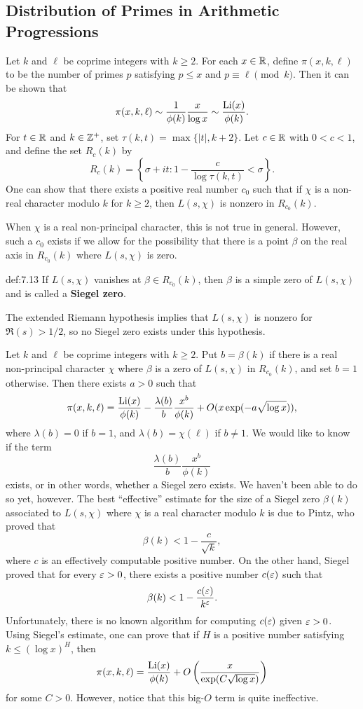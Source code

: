 \subsection{Distribution of Primes in Arithmetic Progressions}\label{subsec:7.7}
Let $k$ and $\ell$ be coprime integers with $k \geq 2$. For each $x \in \mathbb{R}$, 
define $\pi(x, k, \ell)$ to be the number of primes $p$ satisfying 
$p \leq x$ and $p \equiv \ell \pmod k$. Then it can be shown that 
\[ \pi(x, k, \ell) \sim \frac{1}{\phi(k)} \frac{x}{\log x} \sim \frac{\operatorname{Li}(x)}{\phi(k)}. \] 
For $t \in \mathbb{R}$ and $k \in \mathbb{Z}^+$, set $\tau(k, t) = \max\{|t|, k + 2\}$. 
Let $c \in \mathbb{R}$ with $0 < c < 1$, and define the set $R_c(k)$ by 
\[ R_c(k) = \left\{ \sigma + it : 1 - \frac{c}{\log \tau(k, t)} < \sigma \right\}. \] 
One can show that there exists a positive real number $c_0$ such that if 
$\chi$ is a non-real character modulo $k$ for $k \geq 2$, then $L(s, \chi)$ 
is nonzero in $R_{c_0}(k)$. 

When $\chi$ is a real non-principal character, this is not true in general. 
However, such a $c_0$ exists if we allow for the possibility that 
there is a point $\beta$ on the real axis in $R_{c_0}(k)$ where 
$L(s, \chi)$ is zero. 

\begin{defn}{def:7.13} 
    If $L(s, \chi)$ vanishes at $\beta \in R_{c_0}(k)$, then $\beta$ is a 
    simple zero of $L(s, \chi)$ and is called a {\bf Siegel zero}. 
\end{defn}

The extended Riemann hypothesis implies that $L(s, \chi)$ is nonzero for 
$\Re(s) > 1/2$, so no Siegel zero exists under this hypothesis. 

Let $k$ and $\ell$ be coprime integers with $k \geq 2$. Put $b = \beta(k)$ 
if there is a real non-principal character $\chi$ where $\beta$ is a 
zero of $L(s, \chi)$ in $R_{c_0}(k)$, and set $b = 1$ otherwise. Then 
there exists $a > 0$ such that 
\[ \pi(x, k, \ell) = \frac{\operatorname{Li}(x)}{\phi(k)} - \frac{\lambda(b)}{b} \frac{x^b}{\phi(k)} 
+ O(x \exp(-a\sqrt{\log x})), \] 
where $\lambda(b) = 0$ if $b = 1$, and $\lambda(b) = \chi(\ell)$ if $b \neq 1$. 
We would like to know if the term 
\[ \frac{\lambda(b)}{b} \frac{x^b}{\phi(k)} \] 
exists, or in other words, whether a Siegel zero exists. We haven't been 
able to do so yet, however. The best ``effective'' estimate for the size 
of a Siegel zero $\beta(k)$ associated to $L(s, \chi)$ where $\chi$ is a 
real character modulo $k$ is due to Pintz, who proved that 
\[ \beta(k) < 1 - \frac{c}{\sqrt{k}}, \] 
where $c$ is an effectively computable positive number. On the other hand, 
Siegel proved that for every $\varepsilon > 0$, there exists a positive 
number $c(\varepsilon)$ such that 
\[ \beta(k) < 1 - \frac{c(\varepsilon)}{k^{\varepsilon}}. \] 
Unfortunately, there is no known algorithm for computing $c(\varepsilon)$ given 
$\varepsilon > 0$. Using Siegel's estimate, one can prove that if $H$ is a 
positive number satisfying $k \leq (\log x)^H$, then 
\[ \pi(x, k, \ell) = \frac{\operatorname{Li}(x)}{\phi(k)} + O\left( \frac{x}{\exp(C\sqrt{\log x})} \right) \] 
for some $C > 0$. However, notice that this big-$O$ term is quite ineffective. 
